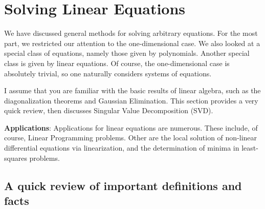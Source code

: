 \chapter{Solving Linear Equations}

We have discussed general methods for solving arbitrary equations. For the most part, we restricted our attention to the one-dimensional case. We also looked at a special class of equations, namely those given by polynomials. Another special class is given by linear equations. Of course, the one-dimensional case is absolutely trivial, so one naturally considers systems of equations. 

\noindent I assume that you are familiar with the basic results of linear algebra, such as the diagonalization theorems and Gaussian Elimination. This section provides a very quick review, then discusses Singular Value Decomposition (SVD).

\medskip
\noindent \textbf{Applications}: Applications for linear equations are numerous. These include, of course, Linear Programming problems. Other are the local solution of non-linear differential equations via linearization, and the determination of minima in least-squares problems. 

\newpage

\section{A quick review of important definitions and facts}

